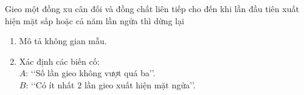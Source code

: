 \begin{vd}%
	Gieo một đồng xu cân đối và đồng chất liên tiếp cho đến khi lần đầu tiên xuất hiện mặt sấp hoặc cả năm lần ngửa thì dừng lại
	\begin{enumerate}
\item Mô tả không gian mẫu.
\item Xác định các biến cố:\\
$A$: \lq\lq Số lần gieo không vượt quá ba\rq\rq.\\
$B$: \lq\lq Có ít nhất $2$ lần gieo xuất hiện mặt ngửa\rq\rq.
\end{enumerate}
\end{vd}

